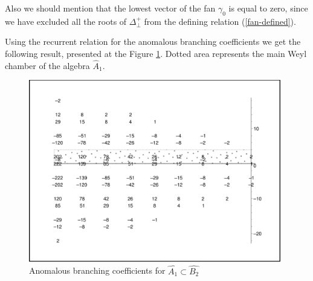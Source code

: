 \documentclass[a4paper,12pt]{article}
\theoremstyle{definition} \newtheorem{Def}{Definition}
\begin{document}
Also we should mention that the lowest vector of the fan $\gamma_0$ is equal to zero, since we have excluded all the roots of $\Delta^{+}_{\bot}$ from the defining relation (\ref{fan-defined}).

Using the recurrent relation for the anomalous branching coefficients we get the following result, presented at the Figure \ref{fig:AffineB2_A1_branching}. Dotted area represents the main Weyl chamber of the algebra $\hat{A}_1$.
\begin{figure}[ph]
  \centering
  \includegraphics[width=110mm]{AffineB2_A1_branching.pdf}
  \caption{Anomalous branching coefficients for $\hat{A_1}\subset \hat{B_2}$}
  \label{fig:AffineB2_A1_branching}
\end{figure}
\end{document}
